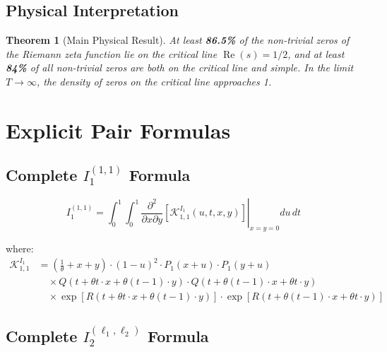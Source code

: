 \documentclass[11pt]{article}
\newtheorem{theorem}{Theorem}
\begin{document}
\subsection{Physical Interpretation}

\begin{theorem}[Main Physical Result]
At least \textbf{86.5\%} of the non-trivial zeros of the Riemann zeta function lie on the critical line $\operatorname{Re}(s) = 1/2$, and at least \textbf{84\%} of all non-trivial zeros are both on the critical line and simple. In the limit $T \to \infty$, the density of zeros on the critical line approaches 1.
\end{theorem}

\appendix

\section{Explicit Pair Formulas}
\label{app:pairs}

\subsection{Complete $I_1^{(1,1)}$ Formula}

\begin{equation}
I_1^{(1,1)} = \int_0^1 \int_0^1 \left.\frac{\partial^2}{\partial x \partial y}\left[\mathcal{K}^{I_1}_{1,1}(u,t,x,y)\right]\right|_{x=y=0} du\, dt
\end{equation}

where:
\begin{align}
\mathcal{K}^{I_1}_{1,1} &= \left(\frac{1}{\theta} + x + y\right) \cdot (1-u)^2 \cdot P_1(x+u) \cdot P_1(y+u) \\
&\quad \times Q(t + \theta t \cdot x + \theta(t-1) \cdot y) \cdot Q(t + \theta(t-1) \cdot x + \theta t \cdot y) \\
&\quad \times \exp\left[R(t + \theta t \cdot x + \theta(t-1) \cdot y)\right] \cdot \exp\left[R(t + \theta(t-1) \cdot x + \theta t \cdot y)\right]
\end{align}

\subsection{Complete $I_2^{(\ell_1,\ell_2)}$ Formula}
\end{document}
